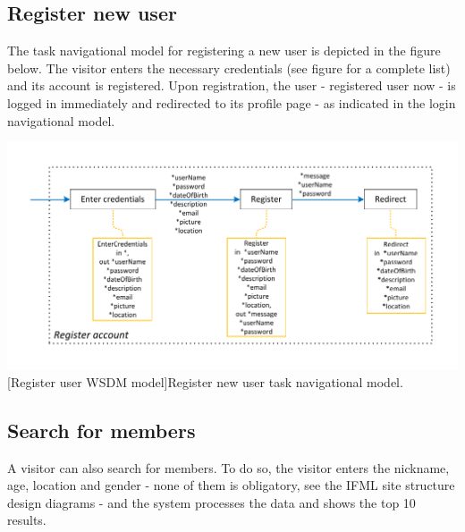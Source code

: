 \documentclass[11pt, a4paper,svglistings,oneside]{book}
\begin{document}
\subsection{Register new user}

The task navigational model for registering a new user is depicted in the figure below. The visitor enters the necessary credentials (see figure for a complete list) and its account is registered. Upon registration, the user - registered user now - is logged in immediately and redirected to its profile page - as indicated in the login navigational model.
$\;$ \\
\noindent\begin{minipage}{\textwidth}
    \centering
   \includegraphics[scale=1]{Nav_Register.pdf}
 [Register user WSDM model]{Register new user task navigational model.}
\end{minipage}

\subsection{Search for members}

A visitor can also search for members. To do so, the visitor enters the nickname, age, location and gender - none of them is obligatory, see the IFML site structure design diagrams - and the system processes the data and shows the top 10 results.
\end{document}
